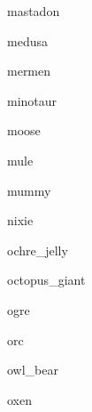 \documentclass[letterpaper,serif]{module}
\begin{document}
\begin{newmonster}{mastadon}\end{newmonster}

\begin{newmonster}{medusa}\end{newmonster}

\begin{newmonster}{mermen}\end{newmonster}

\begin{newmonster}{minotaur}\end{newmonster}

\begin{newmonster}{moose}\end{newmonster}

\begin{newmonster}{mule}\end{newmonster}

\begin{newmonster}{mummy}\end{newmonster}

\begin{newmonster}{nixie}\end{newmonster}

\begin{newmonster}{ochre_jelly}\end{newmonster}

\begin{newmonster}{octopus_giant}\end{newmonster}

\begin{newmonster}{ogre}\end{newmonster}

\begin{newmonster}{orc}\end{newmonster}

\begin{newmonster}{owl_bear}\end{newmonster}

\begin{newmonster}{oxen}\end{newmonster}
\end{document}
